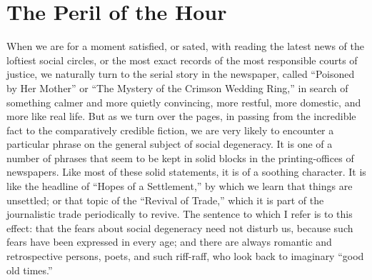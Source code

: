\documentclass{book}
\begin{document}
\chapter{The Peril of the Hour}
\label{chapter-2}
When we are for a moment satisfied, or sated, with reading the latest news of the loftiest social circles, or the most exact records of the most responsible courts of justice, we naturally turn to the serial story in the newspaper, called “Poisoned by Her Mother” or “The Mystery of the Crimson Wedding Ring,” in search of something calmer and more quietly convincing, more restful, more domestic, and more like real life. But as we turn over the pages, in passing from the incredible fact to the comparatively credible fiction, we are very likely to encounter a particular phrase on the general subject of social degeneracy. It is one of a number of phrases that seem to be kept in solid blocks in the printing-offices of newspapers. Like most of these solid statements, it is of a soothing character. It is like the headline of “Hopes of a Settlement,” by which we learn that things are unsettled; or that topic of the “Revival of Trade,” which it is part of the journalistic trade periodically to revive. The sentence to which I refer is to this effect: that the fears about social degeneracy need not disturb us, because such fears have been expressed in every age; and there are always romantic and retrospective persons, poets, and such riff-raff, who look back to imaginary “good old times.”
\end{document}
